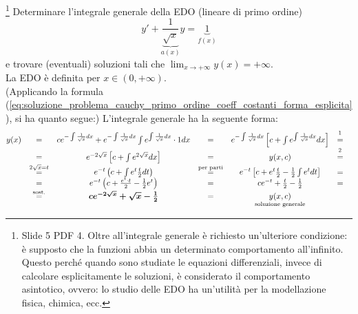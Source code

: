 \begin{example}\footnote{Slide 5 PDF 4. Oltre all'integrale generale è richiesto un'ulteriore condizione: è supposto che la funzioni abbia un determinato comportamento all'infinito. Questo perché quando sono studiate le equazioni differenziali, invece di calcolare esplicitamente le soluzioni, è considerato il comportamento asintotico, ovvero: lo studio delle EDO ha un'utilità per la modellazione fisica, chimica, ecc.}
    Determinare l'integrale generale della EDO (lineare di primo ordine)
    \begin{equation*}
        y'+\underbrace{\frac{1}{\sqrt{x}}}_{a(x)}y=\underbrace{1}_{f(x)}
    \end{equation*}
    e trovare (eventuali) soluzioni tali che $\lim_{x\rightarrow +\infty}y(x)=+\infty$.\\
    La EDO è definita per $x\in(0,+\infty)$.\\
    (Applicando la formula (\ref{eq:soluzione_problema_cauchy_primo_ordine_coeff_costanti_forma_esplicita}), si ha quanto segue:) L'integrale generale ha la seguente forma:
    \begin{equation*}
        \begin{matrix}
            y(x) &=& c e^{-\int \frac{1}{\sqrt{x}}dx} + e^{-\int \frac{1}{\sqrt{x}}dx} \int e^{\int \frac{1}{\sqrt{x}}dx}\cdot1 dx &=& e^{-\int \frac{1}{\sqrt{x}}dx}\left[c+\int e^{\int \frac{1}{\sqrt{x}}dx} 
            dx\right] &\overset{\footnotemark}{=}&\\
            &=& e^{-2\sqrt{x}}\left[c+ \int e^{2\sqrt{x}}dx\right] &=& y(x,c) & \overset{\footnotemark}{=} & \\
            &\overset{2\sqrt{x}=t}{=}& e^{-t}\left(c + \int e^t \frac{t}{2}dt\right) &\overset{\text{per parti}}{=}& e^{-t}\left[c+e^t\frac{t}{2}-\frac{1}{2}\int e^t dt\right] &=&\\
            &=& e^{-t} \left(c + \frac{e^t\cdot t}{2}-\frac{1}{2}e^t\right) &=& ce^{-t} + \frac{t}{2} - \frac{1}{2} &=&\\
            &\overset{\text{sost.}}{=}& \boldsymbol{ce^{-2\sqrt{x}} + \sqrt{x} -\frac{1}{2}} &=& \underset{\text{soluzione generale}}{y(x, c)}
            \end{matrix}
    \end{equation*}
    \addtocounter{footnote}{-1}



\end{example}
